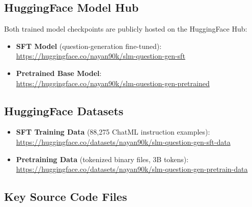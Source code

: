 \documentclass[12pt]{article}
\begin{document}
\subsection{HuggingFace Model Hub}

Both trained model checkpoints are publicly hosted on the HuggingFace Hub:
\begin{itemize}[leftmargin=1.2cm]
  \item \textbf{SFT Model} (question-generation fine-tuned):\\
        \url{https://huggingface.co/nayan90k/slm-question-gen-sft}
  \item \textbf{Pretrained Base Model}:\\
        \url{https://huggingface.co/nayan90k/slm-question-gen-pretrained}
\end{itemize}

\subsection{HuggingFace Datasets}

\begin{itemize}[leftmargin=1.2cm]
  \item \textbf{SFT Training Data} (88,275 ChatML instruction examples):\\
        \url{https://huggingface.co/datasets/nayan90k/slm-question-gen-sft-data}
  \item \textbf{Pretraining Data} (tokenized binary files, 3B tokens):\\
        \url{https://huggingface.co/datasets/nayan90k/slm-question-gen-pretrain-data}
\end{itemize}

\subsection{Key Source Code Files}
\end{document}
